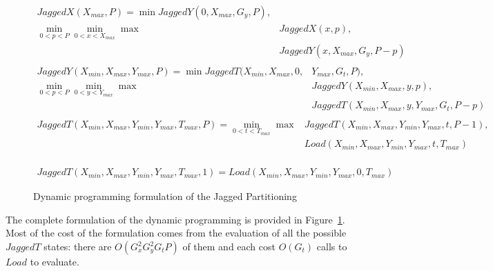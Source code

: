 \documentclass{article}
\begin{document}
\begin{figure}
  \begin{equation}
    \begin{split}
    JaggedX(X_{max}, P)= \min JaggedY(0,X_{max}, G_y, P), & \\
                        \min_{0 < p < P} \min_{0<x<X_{max}} \max & JaggedX(x,p),\\
                                                     & JaggedY(x,X_{max}, G_y, P-p)\\
    \end{split}
  \end{equation}
  \begin{equation}
    \begin{split}
    JaggedY(X_{min}, X_{max}, Y_{max}, P)= \min JaggedT(X_{min},X_{max}, 0, & Y_{max}, G_t, P),  \\
                        \min_{0 < p < P} \min_{0<y<Y_{max}} \max & JaggedY(X_{min}, X_{max}, y, p),\\
                                                      & JaggedT(X_{min}, X_{max}, y,Y_{max}, G_t , P-p)\\
    \end{split}
  \end{equation}
  \begin{equation}
      \begin{split}
    JaggedT(X_{min}, X_{max}, Y_{min}, Y_{max}, T_{max}, P)= \min_{0<t<T_{max}} \max & JaggedT(X_{min}, X_{max}, Y_{min}, Y_{max}, t, P-1),\\
                                                                       & Load(X_{min}, X_{max}, Y_{min}, Y_{max}, t, T_{max})\\
      \end{split}
  \end{equation}

  \begin{equation}
    \begin{split}
      JaggedT(X_{min}, X_{max}, Y_{min}, Y_{max}, T_{max}, 1) = Load (X_{min}, X_{max}, Y_{min}, Y_{max}, 0, T_{max})
    \end{split}
  \end{equation}
      
  \caption{Dynamic programming formulation of the Jagged Partitioning}
  \label{fig:dp:jagged}
\end{figure}

The complete formulation of the dynamic programming is provided in
Figure~\ref{fig:dp:jagged}. Most of the cost of the formulation comes
from the evaluation of all the possible $JaggedT$ states: there are
$O(G_x^2 G_y^2 G_t P)$ of them and each cost $O(G_t)$ calls to $Load$
to evaluate.
\end{document}
